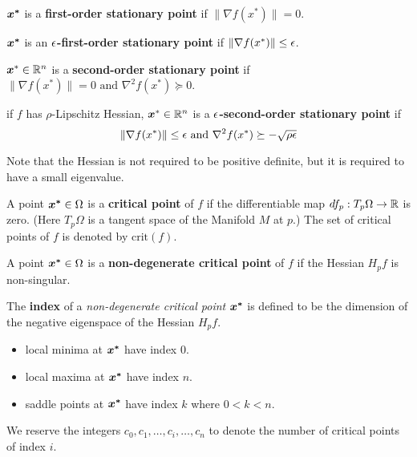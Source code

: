 \documentclass[10pt]{article}
\begin{document}
    \begin{definition}
        $\bm{x^*}$ is a \textbf{first-order stationary point}
        if $\| \nabla f(x^*) \| = 0$.
    \end{definition}

    \begin{definition}
        $\bm{x^*}$ is an \textbf{$\epsilon$-first-order stationary point} 
        if $\|\nabla f(x^*)\| \leq \epsilon$. 
    \end{definition}

    \begin{definition}
        $\bm{x}^* \in \mathbb{R}^n$ is a \textbf{second-order stationary point} if 
        $\| \nabla f(x^*) \| = 0\text{ and } \nabla^2 f(x^*) \succeq 0$.
    \end{definition}

    \begin{definition}
        if $f$ has $\rho$-Lipschitz Hessian, $\bm{x}^* \in \mathbb{R}^n$ is a
        \textbf{$\epsilon$-second-order stationary point} if 
        $$
            \| \nabla f(x^*) \| \leq \epsilon \text{ and }\nabla^2 f(x^*) \succeq -\sqrt{\rho \epsilon}
        $$
        \begin{remark}
            Note that the Hessian is not required to be positive definite, 
            but it is required to have a small eigenvalue. 
        \end{remark}
    \end{definition}

    \begin{definition}
        A point $\bm{x^*} \in \Omega$ is a \textbf{critical point} of $f$ if the
        differentiable map $df_p: T_p \Omega \rightarrow \mathbb{R}$ is zero. (Here
        $T_p \Omega$ is a tangent space of the Manifold $M$ at $p$.) 
        The set of critical points of $f$ is denoted by $\text{crit}(f)$.
    \end{definition}

    \begin{definition}
        A point $\bm{x^*} \in \Omega$ is a \textbf{non-degenerate critical point} of $f$ if
        the Hessian $H_p f$ is non-singular.
    \end{definition}

    \begin{definition}
        The \textbf{index} of a \emph{non-degenerate critical point} $\bm{x^*}$ is defined to be
        the dimension of the negative eigenspace of the Hessian $H_p f$.
        \begin{itemize}
            \item local minima at $\bm{x^*}$ have index $0$.
            \item local maxima at $\bm{x^*}$ have index $n$.
            \item saddle points at $\bm{x^*}$ have index $k$ where $0 < k < n$.
        \end{itemize}
        We reserve the integers $c_0, c_1, \dots, c_i, \dots, c_n$ to denote the number of
        critical points of index $i$.
    \end{definition}
\end{document}
